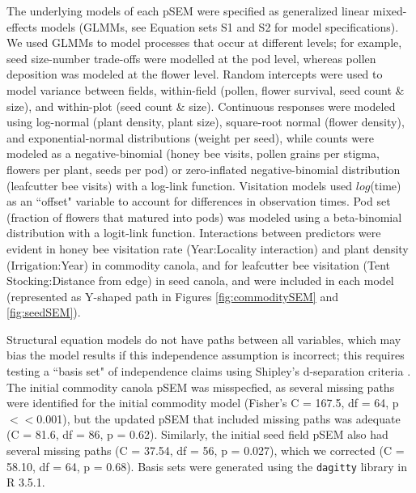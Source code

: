 \documentclass[12pt, draft]{article} %
\begin{document}
The underlying models of each pSEM were specified as generalized linear mixed-effects models (GLMMs, see Equation sets S1 and S2 for model specifications).
We used GLMMs to model processes that occur at different levels; for example, seed size-number trade-offs were modelled at the pod level, whereas pollen deposition was modeled at the flower level.
Random intercepts were used to model variance between fields, within-field (pollen, flower survival, seed count \& size), and within-plot (seed count \& size).
Continuous responses were modeled using log-normal (plant density, plant size), square-root normal (flower density), and exponential-normal distributions (weight per seed), while counts were modeled as a negative-binomial (honey bee visits, pollen grains per stigma, flowers per plant, seeds per pod) or zero-inflated negative-binomial distribution (leafcutter bee visits) with a log-link function.
Visitation models used $log$(time) as an ``offset" variable to account for differences in observation times.
Pod set (fraction of flowers that matured into pods) was modeled using a beta-binomial distribution with a logit-link function.
Interactions between predictors were evident in honey bee visitation rate (Year:Locality interaction) and plant density (Irrigation:Year) in commodity canola, and for leafcutter bee visitation (Tent Stocking:Distance from edge) in seed canola, and were included in each model (represented as Y-shaped path in Figures \ref{fig:commoditySEM} and \ref{fig:seedSEM}). 

Structural equation models do not have paths between all variables, which may bias the model results if this independence assumption is incorrect; this requires testing a ``basis set" of independence claims using Shipley's d-separation criteria \citep{shipley2000, shipley2009}.
The initial commodity canola pSEM was misspecfied, as several missing paths were identified for the initial commodity model (Fisher's C = 167.5, df = 64, p$<<$0.001), but the updated pSEM that included missing paths was adequate (C = 81.6, df = 86, p = 0.62).
Similarly, the initial seed field pSEM also had several missing paths (C = 37.54, df = 56, p = 0.027), which we corrected (C = 58.10, df = 64, p = 0.68).
Basis sets were generated using the \texttt{dagitty} library in R 3.5.1.

\end{document}
